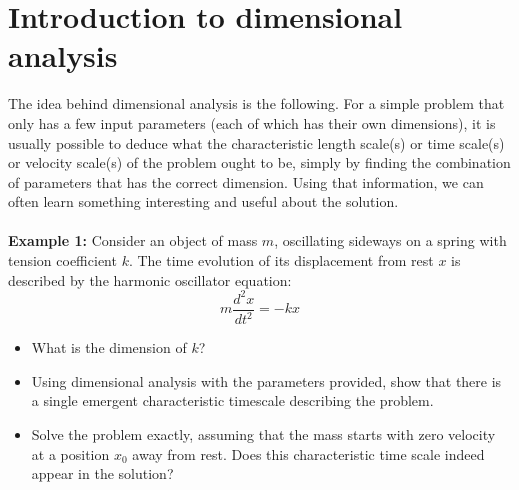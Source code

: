 \section{Introduction to dimensional analysis}

The idea behind dimensional analysis is the following. For a simple problem that only has a few input parameters (each of which has their own dimensions), it is usually possible to deduce what the characteristic length scale(s) or time scale(s) or velocity scale(s) of the problem ought to be, simply by finding the combination of parameters that has the correct dimension. 
Using that information, we can often learn something interesting and useful about the solution.
\\
\\
{\bf Example 1:} Consider an object of mass $m$, oscillating sideways on a spring with tension coefficient $k$. The time evolution of its displacement from rest $x$ is described by the harmonic oscillator equation:  
\begin{equation}
m\frac{d^2 x}{dt^2} = - k x 
\end{equation}
\begin{itemize}
    \item What is the dimension of $k$?
    \item Using dimensional analysis with the parameters provided, show that there is a single emergent characteristic timescale describing the problem.
    \item Solve the problem exactly, assuming that the mass starts with zero velocity at a position $x_0$ away from rest. Does this characteristic time scale indeed appear in the solution?
\end{itemize}
\\
